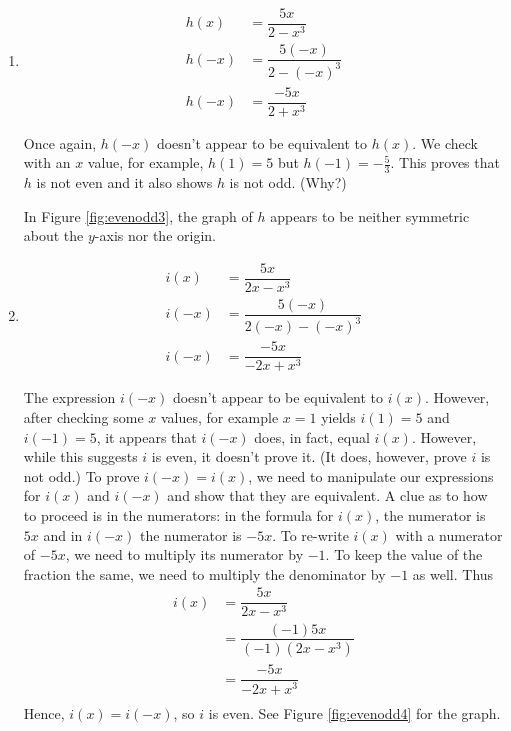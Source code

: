 {\begin{enumerate}
\item  \begin{align*}
h(x) & =  \dfrac{5x}{2 - x^3}  \\[3pt] 
h(-x) & =  \dfrac{5(-x)}{2 - (-x)^3}  \\[3pt]  
h(-x) & =  \dfrac{-5x}{2 + x^3} 
\end{align*}

Once again, $h(-x)$ doesn't appear to be equivalent to $h(x)$.  We check with an $x$ value, for example, $h(1) = 5$ but $h(-1) = -\frac{5}{3}$.  This proves that $h$ is not even and it also shows $h$ is not odd. (Why?)  


In Figure \ref{fig:evenodd3}, the graph of $h$ appears to be neither symmetric about the $y$-axis nor the origin.

\drawexampleline

\item \begin{align*}
i(x) & =  \dfrac{5x}{2x - x^3}  \\[3pt]
i(-x) & =  \dfrac{5(-x)}{2(-x) - (-x)^3}  \\[3pt]
i(-x) & =  \dfrac{-5x}{-2x + x^3}
\end{align*}

The expression  $i(-x)$ doesn't appear to be equivalent to $i(x)$.  However, after checking some $x$ values, for example $x=1$ yields $i(1) = 5$ and $i(-1 )= 5$, it appears that $i(-x)$ does, in fact, equal $i(x)$.  However, while this suggests  $i$ is even, it doesn't prove it.  (It does, however, prove $i$ is not odd.)  To prove $i(-x) = i(x)$, we need to manipulate our expressions for $i(x)$ and $i(-x)$ and show that they are equivalent.  A clue as to how to proceed is in the numerators: in the formula for $i(x)$, the numerator is $5x$ and in $i(-x)$ the numerator is $-5x$.  To re-write $i(x)$ with a numerator of $-5x$, we need to multiply its numerator by $-1$.  To keep the value of the fraction the same, we need to multiply the denominator by $-1$ as well.  Thus
\enlargethispage{\baselineskip}
\begin{align*}
i(x) & =  \dfrac{5x}{2x - x^3} \\[3pt]
& =  \dfrac{(-1) 5x}{(-1)\left(2x - x^3\right)} \\[3pt]
& =  \dfrac{-5x}{-2x + x^3} \\[3pt]
\end{align*}
Hence, $i(x) = i(-x)$, so $i$ is even. See Figure \ref{fig:evenodd4} for the graph.


\end{enumerate}}
